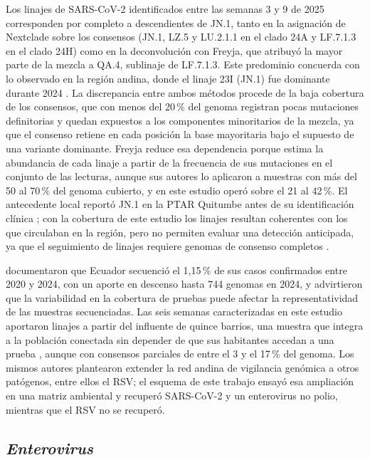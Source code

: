 Los linajes de SARS-CoV-2 identificados entre las semanas 3 y 9 de 2025 corresponden por completo a descendientes de JN.1, tanto en la asignación de Nextclade sobre los consensos (JN.1, LZ.5 y LU.2.1.1 en el clado 24A y LF.7.1.3 en el clado 24H) como en la deconvolución con Freyja, que atribuyó la mayor parte de la mezcla a QA.4, sublinaje de LF.7.1.3. Este predominio concuerda con lo observado en la región andina, donde el linaje 23I (JN.1) fue dominante durante 2024 \cite{Bruno_2025}. La discrepancia entre ambos métodos procede de la baja cobertura de los consensos, que con menos del 20\,\% del genoma registran pocas mutaciones definitorias y quedan expuestos a los componentes minoritarios de la mezcla, ya que el consenso retiene en cada posición la base mayoritaria bajo el supuesto de una variante dominante. Freyja reduce esa dependencia porque estima la abundancia de cada linaje a partir de la frecuencia de sus mutaciones en el conjunto de las lecturas, aunque sus autores lo aplicaron a muestras con más del 50 al 70\,\% del genoma cubierto, y en este estudio operó sobre el 21 al 42\,\%. El antecedente local reportó JN.1 en la PTAR Quitumbe antes de su identificación clínica \cite{MejiaCalle_2024}; con la cobertura de este estudio los linajes resultan coherentes con los que circulaban en la región, pero no permiten evaluar una detección anticipada, ya que el seguimiento de linajes requiere genomas de consenso completos \cite{Crits_Christoph_2021,Karthikeyan_2022}.

 documentaron que Ecuador secuenció el 1,15\,\% de sus casos confirmados entre 2020 y 2024, con un aporte en descenso hasta 744 genomas en 2024, y advirtieron que la variabilidad en la cobertura de pruebas puede afectar la representatividad de las muestras secuenciadas. Las seis semanas caracterizadas en este estudio aportaron linajes a partir del influente de quince barrios, una muestra que integra a la población conectada sin depender de que sus habitantes accedan a una prueba \cite{Parkins_2023}, aunque con consensos parciales de entre el 3 y el 17\,\% del genoma. Los mismos autores plantearon extender la red andina de vigilancia genómica a otros patógenos, entre ellos el RSV; el esquema de este trabajo ensayó esa ampliación en una matriz ambiental y recuperó SARS-CoV-2 y un enterovirus no polio, mientras que el RSV no se recuperó.

\subsection{\textit{Enterovirus}}


